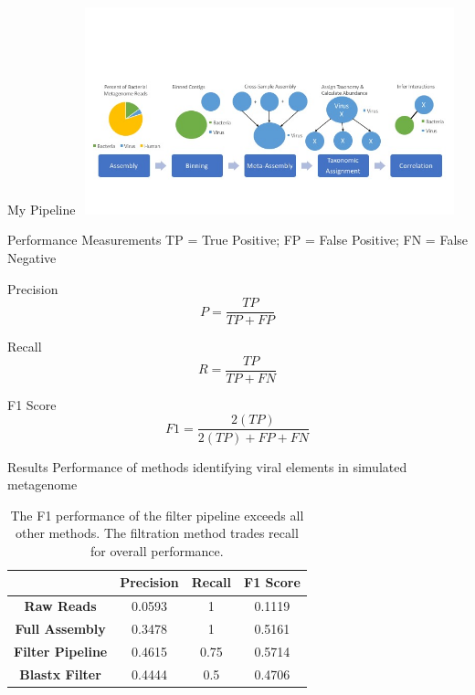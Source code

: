 \documentclass[11pt]{beamer}
\begin{document}
	\begin{frame}{My Pipeline}
	\vspace{-1cm}
	\includegraphics[height=6cm, width=11cm]{figure_2_updated.jpg}
	\end{frame}
	
	
	\begin{frame}{Performance Measurements}
	TP = True Positive; FP = False Positive; FN = False Negative
	\begin{block}{Precision}
	\begin{equation}
	P = \frac{TP} {TP + FP} \nonumber
	\end{equation}
	\end{block}
	\begin{block}{Recall}
	\begin{equation}
	R = \frac{TP}{TP + FN} \nonumber
	\end{equation}
	\end{block}
	\begin{block}{F1 Score}
	\begin{equation}
	F1 = \frac{2(TP)}{2(TP) + FP + FN} \nonumber
	\end{equation}
	\end{block}
	\end{frame}
	
	
	\begin{frame}{Results}
	Performance of methods identifying viral elements in simulated metagenome
	\begin{table}
	\begin{tabular}{|c || c | c | c | }
	\hline
	& \textbf{Precision} & \textbf{Recall} & \textbf{F1 Score} \\
	\hline
	\hline
	\textbf{Raw Reads} & 0.0593 & 1 & 0.1119 \\
	\hline
	\textbf{Full Assembly} & 0.3478 & 1 & 0.5161 \\
	\hline
	\textbf{Filter Pipeline} & \alert{0.4615} & 0.75 & \alert{0.5714} \\
	\hline
	\textbf{Blastx Filter} & 0.4444 & 0.5 & 0.4706 \\
	\hline
	\end{tabular}
	
	\caption{The F1 performance of the filter pipeline exceeds all other methods. The filtration method trades recall for overall performance.}
	\end{table}
	\end{frame}
	
\end{document}
